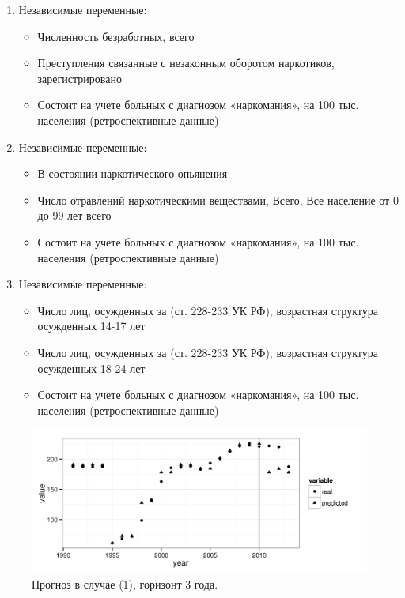 \documentclass[a4paper,14pt]{article}
\begin{document}
\begin{enumerate}
	\item Независимые переменные:
	\begin{itemize}
		\item Численность безработных, всего
		\item Преступления связанные с незаконным оборотом наркотиков, зарегистрировано
		\item Состоит на учете больных с диагнозом «наркомания», на 100 тыс. населения (ретроспективные данные)
	\end{itemize}
	\item Независимые переменные:
	\begin{itemize}
		\item В состоянии наркотического опьянения
		\item Число отравлений наркотическими веществами, Всего, Все население от 0 до 99 лет  всего
		\item Состоит на учете больных с диагнозом «наркомания», на 100 тыс. населения (ретроспективные данные)
	\end{itemize}
	\item Независимые переменные:
	\begin{itemize}
		\item Число лиц, осужденных за (ст. 228-233 УК РФ), возрастная структура осужденных  14-17 лет
		\item Число лиц, осужденных за (ст. 228-233 УК РФ), возрастная структура осужденных  18-24 лет
		\item Состоит на учете больных с диагнозом «наркомания», на 100 тыс. населения (ретроспективные данные)
	\end{itemize}			
\end{enumerate}

\begin{figure}[bhtp]
	\begin{center}
		\includegraphics{images/m_plot1.png}
		\caption{Прогноз в случае (1), горизонт 3 года.}		
		\label{figure:m_plot1}
	\end{center}
\end{figure}
\end{document}
